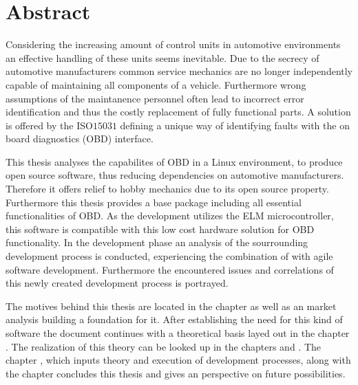 

\chapter*{Abstract}
\label{cha:abstract}

Considering the increasing amount of control units in automotive environments an effective handling of these units seems inevitable. Due to the secrecy 
of automotive manufacturers common service mechanics are no longer independently capable of maintaining all components of a vehicle. Furthermore wrong assumptions of the 
maintanence personnel often lead to incorrect error identification and thus the costly replacement of fully functional parts. A solution is offered by 
the ISO$15031$ defining a unique way of identifying faults with the on board diagnostics (OBD) interface.

This thesis analyses the capabilites of OBD in a Linux environment, to produce open source software, thus reducing dependencies on automotive manufacturers. 
Therefore it offers relief to hobby mechanics due to its open source property. Furthermore this thesis provides a base package including all essential 
functionalities of OBD. As the development utilizes the ELM microcontroller, this software is compatible with this low cost hardware solution for OBD functionality. 
In the development phase an analysis of the sourrounding development process is conducted, experiencing the combination of  with agile software 
development. Furthermore the encountered issues and correlations of this newly created development process is portrayed.

The motives behind this thesis are located in the chapter  as well as an market analysis building a foundation for it. After establishing the 
need for this kind of software the document continues with a theoretical basis layed out in the chapter . The realization of this theory can 
be looked up in the chapters  and . The chapter , which inputs theory and 
execution of development processes, along with the  chapter concludes this thesis and gives an perspective on future possibilities.

